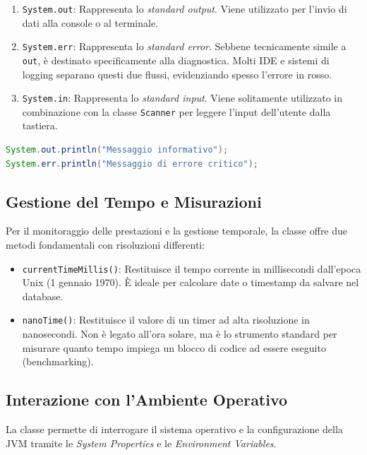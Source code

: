 \begin{enumerate}
    \item \texttt{System.out}: Rappresenta lo \textit{standard output}. Viene utilizzato per l'invio di dati alla console o al terminale.
    \item \texttt{System.err}: Rappresenta lo \textit{standard error}. Sebbene tecnicamente simile a \texttt{out}, è destinato specificamente alla diagnostica. Molti IDE e sistemi di logging separano questi due flussi, evidenziando spesso l'errore in rosso.
    \item \texttt{System.in}: Rappresenta lo \textit{standard input}. Viene solitamente utilizzato in combinazione con la classe \texttt{Scanner} per leggere l'input dell'utente dalla tastiera.
\end{enumerate}

\begin{lstlisting}[language=Java, caption={Esempio di utilizzo dei flussi standard}]
System.out.println("Messaggio informativo");
System.err.println("Messaggio di errore critico");
\end{lstlisting}

\subsection{Gestione del Tempo e Misurazioni}

Per il monitoraggio delle prestazioni e la gestione temporale, la classe offre due metodi fondamentali con risoluzioni differenti:

\begin{itemize}
    \item \texttt{currentTimeMillis()}: Restituisce il tempo corrente in millisecondi dall'epoca Unix (1 gennaio 1970). È ideale per calcolare date o timestamp da salvare nel database.
    \item \texttt{nanoTime()}: Restituisce il valore di un timer ad alta risoluzione in nanosecondi. Non è legato all'ora solare, ma è lo strumento standard per misurare quanto tempo impiega un blocco di codice ad essere eseguito (benchmarking).
\end{itemize}

\subsection{Interazione con l'Ambiente Operativo}

La classe permette di interrogare il sistema operativo e la configurazione della JVM tramite le \textit{System Properties} e le \textit{Environment Variables}.

